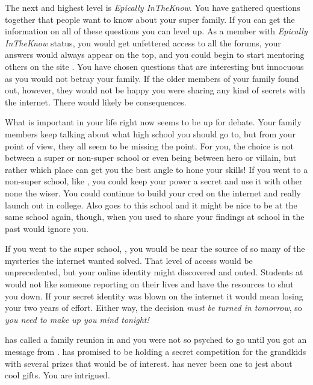 \documentclass[char]{LRSguildcamp1}
\begin{document}
The next and highest level is \textsl{Epically InTheKnow}. You have gathered questions together that people want to know about your super family. If you can get the information on all of these questions you can level up. As a member with \textit{Epically InTheKnow} status, you would get unfettered access to all the forums, your answers would always appear on the top, and you could begin to start mentoring others on the site \pTweenwebsite{}. You have chosen questions that are interesting but innocuous as you would not betray your family. If the older members of your family found out, however, they would not be happy you were sharing any kind of secrets with the internet. There would likely be consequences. 

What is important in your life right now seems to be up for debate. Your family members keep talking about what high school you should go to, but from your point of view, they all seem to be missing the point. For you, the choice is not between a super or non-super school or even being  between hero or villain, but rather which place can get you the best angle to hone your skills! If you went to a non-super school, like \pNormalSchool{}, you could keep your power a secret and use it with other none the wiser. You could continue to build your cred on the internet and really launch out in college. Also \cTeen{} goes to this school and it might be nice to be at the same school again, though, when you used to share your findings at school in the past \cTeen{} would ignore you. 

If you went to the super school, \pSuperSchool{}, you would be near the source of so many of the mysteries the internet wanted solved. That level of access would be unprecedented, but your online identity might discovered and outed. Students at \pSuperSchool{} would not like someone reporting on their lives and have the resources to shut you down. If your secret identity was blown on the internet it would mean losing your two years of effort. Either way, the decision \textsl{must be turned in tomorrow}, so \textit{you need to make up you mind tonight!}

\cGrandma{} has called a family reunion in \pCityGrandma{} and you were not so psyched to go until you got an message from \cGrandma{}. \cGrandma{\They} has promised to be holding a secret competition for the grandkids with several prizes that would be of interest. \cGrandma{} has never been one to jest about cool gifts. You are intrigued.  
\end{document}
